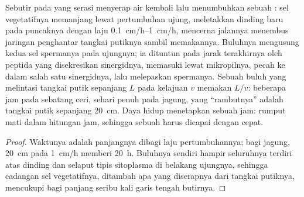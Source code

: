 \begin{theorem}\label{thm:b2:angiosperm-reproduction:tube}
Sebutir  pada  yang serasi menyerap air kembali
lalu menumbuhkan sebuah \emph{}: sel vegetatifnya
memanjang lewat pertumbuhan ujung, meletakkan dinding baru pada
puncaknya dengan laju \qtyrange{0.1}{1}{cm/h}, mencerna jalannya
menembus jaringan penghantar tangkai putiknya sambil memakannya.
Buluhnya mengusung kedua sel spermanya pada ujungnya; ia dituntun pada
jarak terakhirnya oleh peptida yang disekresikan sinergidnya, memasuki
 lewat mikropilnya, pecah ke dalam salah satu sinergidnya,
lalu melepaskan spermanya. Sebuah buluh yang melintasi tangkai putik
sepanjang $L$ pada kelajuan $v$ memakan $L/v$: beberapa jam pada
sebatang ceri, sehari penuh pada jagung, yang ``rambutnya'' adalah
tangkai putik sepanjang \qty{20}{cm}. Daya hidup  menetapkan
sebuah jam:  rumput mati dalam hitungan jam, sehingga
sebuah  harus dicapai dengan cepat.
\end{theorem}
\begin{proof}
Waktunya adalah panjangnya dibagi laju pertumbuhannya; bagi jagung,
\qty{20}{cm} pada \qty{1}{cm/h} memberi \qty{20}{h}. Buluhnya sendiri
hampir seluruhnya terdiri atas dinding dan selaput tipis sitoplasma di
belakang ujungnya, sehingga cadangan sel vegetatifnya, ditambah apa
yang diserapnya dari tangkai putiknya, mencukupi bagi panjang seribu
kali garis tengah butirnya.
\end{proof}

